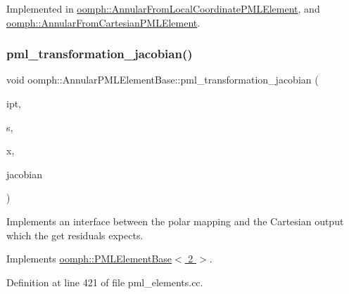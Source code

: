 Implemented in \hyperlink{classoomph_1_1AnnularFromLocalCoordinatePMLElement_a161e427b6f1fc6349b9667caf346cf8a}{oomph\+::\+Annular\+From\+Local\+Coordinate\+P\+M\+L\+Element}, and \hyperlink{classoomph_1_1AnnularFromCartesianPMLElement_acac12e9f2f6df3e9edebb7747ce4fab8}{oomph\+::\+Annular\+From\+Cartesian\+P\+M\+L\+Element}.

\mbox{\label{classoomph_1_1AnnularPMLElementBase_a2f79efade3e4be24515b2960f447e10e}} 
\subsubsection{\texorpdfstring{pml\+\_\+transformation\+\_\+jacobian()}{pml\_transformation\_jacobian()}\hspace{0.1cm}{\footnotesize\ttfamily [1/2]}}
{\footnotesize\ttfamily void oomph\+::\+Annular\+P\+M\+L\+Element\+Base\+::pml\+\_\+transformation\+\_\+jacobian (\begin{DoxyParamCaption}\item[{const unsigned \&}]{ipt,  }\item[{const \hyperlink{classoomph_1_1Vector}{Vector}$<$ double $>$ \&}]{s,  }\item[{const \hyperlink{classoomph_1_1Vector}{Vector}$<$ double $>$ \&}]{x,  }\item[{\hyperlink{classoomph_1_1DenseComplexMatrix}{Dense\+Complex\+Matrix} \&}]{jacobian }\end{DoxyParamCaption})\hspace{0.3cm}{\ttfamily [pure virtual]}}



Implements an interface between the polar mapping and the Cartesian output which the get residuals expects. 



Implements \hyperlink{classoomph_1_1PMLElementBase_a770d8de20d8ae2d55f5f006052a39b3f}{oomph\+::\+P\+M\+L\+Element\+Base$<$ 2 $>$}.



Definition at line 421 of file pml\+\_\+elements.\+cc.

\mbox{\label{classoomph_1_1AnnularPMLElementBase_a071a64f7677e50ee93c5c568ca59fff2}} 

